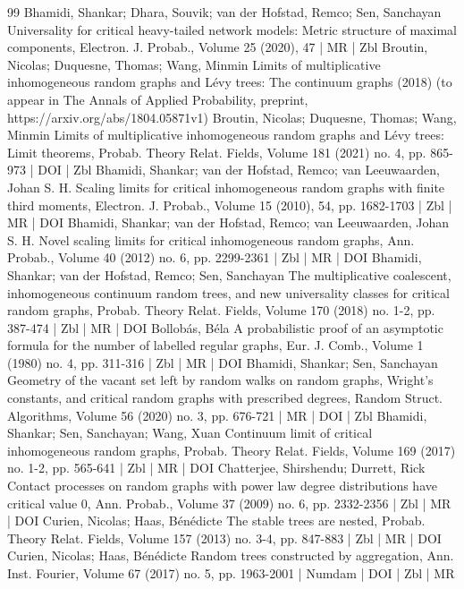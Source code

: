 \begin{thebibliography}{99}
Bhamidi, Shankar; Dhara, Souvik; van der Hofstad, Remco; Sen, Sanchayan Universality for critical heavy-tailed network models: Metric structure of maximal components, Electron. J. Probab., Volume 25 (2020), 47 | MR | Zbl
Broutin, Nicolas; Duquesne, Thomas; Wang, Minmin Limits of multiplicative inhomogeneous random graphs and Lévy trees: The continuum graphs (2018) (to appear in The Annals of Applied Probability, preprint, https://arxiv.org/abs/1804.05871v1)
Broutin, Nicolas; Duquesne, Thomas; Wang, Minmin Limits of multiplicative inhomogeneous random graphs and Lévy trees: Limit theorems, Probab. Theory Relat. Fields, Volume 181 (2021) no. 4, pp. 865-973 | DOI | Zbl
Bhamidi, Shankar; van der Hofstad, Remco; van Leeuwaarden, Johan S. H. Scaling limits for critical inhomogeneous random graphs with finite third moments, Electron. J. Probab., Volume 15 (2010), 54, pp. 1682-1703 | Zbl | MR | DOI
Bhamidi, Shankar; van der Hofstad, Remco; van Leeuwaarden, Johan S. H. Novel scaling limits for critical inhomogeneous random graphs, Ann. Probab., Volume 40 (2012) no. 6, pp. 2299-2361 | Zbl | MR | DOI
Bhamidi, Shankar; van der Hofstad, Remco; Sen, Sanchayan The multiplicative coalescent, inhomogeneous continuum random trees, and new universality classes for critical random graphs, Probab. Theory Relat. Fields, Volume 170 (2018) no. 1-2, pp. 387-474 | Zbl | MR | DOI
Bollobás, Béla A probabilistic proof of an asymptotic formula for the number of labelled regular graphs, Eur. J. Comb., Volume 1 (1980) no. 4, pp. 311-316 | Zbl | MR | DOI
Bhamidi, Shankar; Sen, Sanchayan Geometry of the vacant set left by random walks on random graphs, Wright’s constants, and critical random graphs with prescribed degrees, Random Struct. Algorithms, Volume 56 (2020) no. 3, pp. 676-721 | MR | DOI | Zbl
Bhamidi, Shankar; Sen, Sanchayan; Wang, Xuan Continuum limit of critical inhomogeneous random graphs, Probab. Theory Relat. Fields, Volume 169 (2017) no. 1-2, pp. 565-641 | Zbl | MR | DOI
Chatterjee, Shirshendu; Durrett, Rick Contact processes on random graphs with power law degree distributions have critical value 0, Ann. Probab., Volume 37 (2009) no. 6, pp. 2332-2356 | Zbl | MR | DOI
Curien, Nicolas; Haas, Bénédicte The stable trees are nested, Probab. Theory Relat. Fields, Volume 157 (2013) no. 3-4, pp. 847-883 | Zbl | MR | DOI
Curien, Nicolas; Haas, Bénédicte Random trees constructed by aggregation, Ann. Inst. Fourier, Volume 67 (2017) no. 5, pp. 1963-2001 | Numdam | DOI | Zbl | MR

\end{thebibliography}
